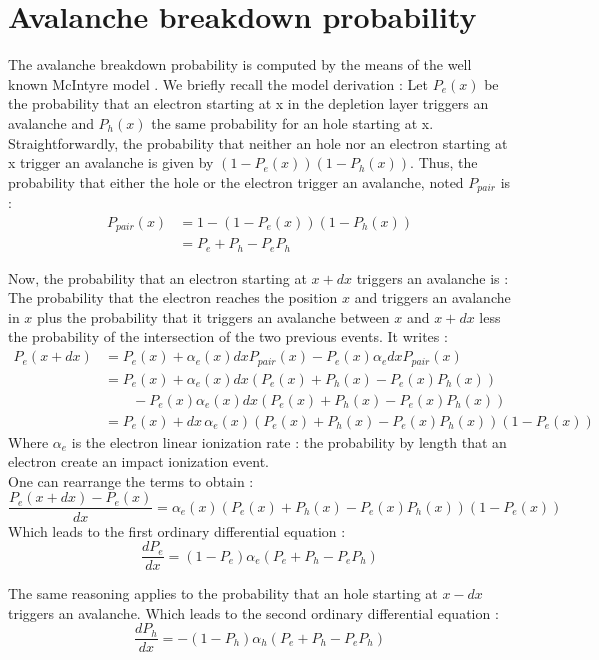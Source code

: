 \documentclass[11pt,a4paper,twocolumn]{article}
\begin{document}
\section{Avalanche breakdown probability}
The avalanche breakdown probability is computed by the means of the well known McIntyre model \cite{oldham_triggering_1972}. We briefly recall the model derivation : 
Let $P_e(x)$ be the probability that an electron starting at x in the depletion layer triggers an avalanche and $P_h(x)$ the same probability for an hole starting at x.
Straightforwardly, the probability that neither an hole nor an electron starting at x trigger an avalanche is given by $(1-P_e(x))(1-P_h(x))$.
Thus, the probability that either the hole or the electron trigger an avalanche, noted $P_{pair}$ is :
\begin{align*}
P_{pair}(x) &= 1 - \left( 1-P_e(x)\right)\left(1-P_h(x)\right)  \\
			&= P_e + P_h - P_e P_h
\end{align*}

Now, the probability that an electron starting at $x+dx$ triggers an avalanche is :
The probability that the electron reaches the position $x$ and triggers an avalanche in $x$ plus the probability that it triggers an avalanche between $x$ and $x+dx$ less the probability of the intersection of the two previous events. It writes : 
\begin{align*}
P_e(x+dx) &= P_e(x) + \alpha_e(x) dx P_{pair}(x)  - P_e(x)  \alpha_e dx P_{pair}(x) \\
		  &= P_e(x) + \alpha_e(x) dx (P_e(x) + P_h(x) - P_e(x) P_h(x)) \\& \qquad - P_e(x) \alpha_e(x) dx (P_e(x) + P_h(x) - P_e(x) P_h(x)) \\
		  &=  P_e(x) + dx \, \alpha_e(x) (P_e(x) + P_h(x) - P_e(x) P_h(x)) (1 - P_e(x))
\end{align*}
Where $\alpha_e$ is the electron linear ionization rate : the probability by length that an electron create an impact ionization event.  \\
One can rearrange the terms to obtain : 
\[ \frac{P_e(x+dx)-P_e(x)}{dx} = \alpha_e(x) (P_e(x) + P_h(x) - P_e(x) P_h(x)) (1 - P_e(x)) \]
Which leads to the first ordinary differential equation : 
\[ \frac{dP_e}{dx} = (1-P_e)\alpha_e(P_e + P_h - P_e  P_h) \]

The same reasoning applies to the probability that an hole starting at $x-dx$ triggers an avalanche.
Which leads to the second ordinary differential equation : 
\[ \frac{dP_h}{dx} = -(1-P_h)\alpha_h(P_e + P_h - P_e  P_h) \]
\end{document}
